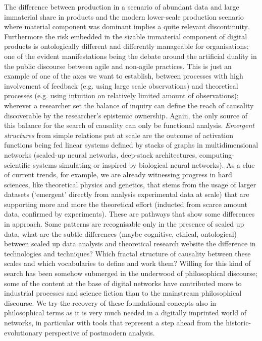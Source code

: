 \documentclass[14pt,a4paper]{extarticle}
\begin{document}
The difference between production in a scenario of abundant data and large immaterial share in products and the modern lower-scale production scenario where material component was dominant implies a quite relevant discontinuity.
\newline
Furthermore the risk embedded in the sizable immaterial component of digital products is ontologically different and differently manageable for organisations; one of the evident manifestations being the debate around the artificial duality in the public discourse between agile and non-agile practices. This is just an example of one of the axes we want to establish, between processes with high involvement of feedback (e.g. using large scale observations) and theoretical processes (e.g. using intuition on relatively limited amount of observations); wherever a researcher set the balance of inquiry can define the reach of causality discoverable by the researcher’s epistemic ownership. Again, the only source of this balance for the search of causality can only be functional analysis.
\newline
\hspace*{15mm}\textit{Emergent structures} from simple relations put at scale are the outcome of activation functions being fed linear systems defined by stacks of graphs in multidimensional networks (scaled-up neural networks, deep-stack architectures, computing-scientific systems simulating or inspired by biological neural networks). As a clue of current trends, for example, we are already witnessing progress in hard sciences, like theoretical physics and genetics, that stems from the usage of larger datasets (‘emergent’ directly from analysis experimental data at scale) that are supporting more and more the theoretical effort (inducted from scarce amount data, confirmed by experiments). These are pathways that show some differences in approach. Some patterns are recognisable only in the presence of scaled up data, what are the subtle differences (maybe cognitive, ethical, ontological) between scaled up data analysis and theoretical research website the difference in technologies and techniques? Which fractal structure of causality between these scales and which vocabularies to define and work them?
\newline
Willing for this kind of search has been somehow submerged in the underwood of philosophical discourse; some of the content at the base of digital networks have contributed more to industrial processes and science fiction than to the mainstream philosophical discourse. We try the recovery of these foundational concepts also in philosophical terms as it is very much needed in a digitally imprinted world of networks, in particular with tools that represent a step ahead from the historic-evolutionary perspective of postmodern analysis.
\end{document}
